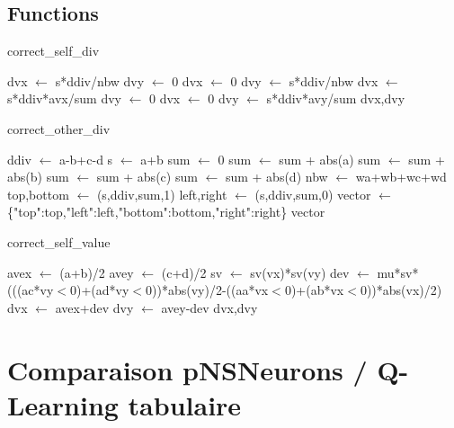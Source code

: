 \documentclass[10pt]{article}
\begin{document}
\newpage
\subsection{Functions}
\begin{algorithm}
\caption{correct\_self\_div}
\begin{algorithmic}
\STATE dvx $\leftarrow$ s*ddiv/nbw
\STATE dvy $\leftarrow$ 0
\ELSE
\STATE dvx $\leftarrow$ 0
\STATE dvy $\leftarrow$ s*ddiv/nbw
\ENDIF
\ELSE
{}
\STATE dvx $\leftarrow$ s*ddiv*avx/sum
\STATE dvy $\leftarrow$ 0
\ELSE
\STATE dvx $\leftarrow$ 0
\STATE dvy $\leftarrow$ s*ddiv*avy/sum
\ENDIF
\ENDIF
\RETURN dvx,dvy
\end{algorithmic}
\end{algorithm}

\begin{algorithm}
\caption{correct\_other\_div}
\begin{algorithmic}
\STATE ddiv $\leftarrow$ a-b+c-d
\STATE s $\leftarrow$ a+b
\STATE sum $\leftarrow$ 0
\STATE sum $\leftarrow$ sum + abs(a)
\ENDIF
{}
\STATE sum $\leftarrow$ sum + abs(b)
\ENDIF
{}
\STATE sum $\leftarrow$ sum + abs(c)
\ENDIF
{}
\STATE sum $\leftarrow$ sum + abs(d)
\ENDIF
\STATE nbw $\leftarrow$ wa+wb+wc+wd
\STATE top,bottom $\leftarrow$ (s,ddiv,sum,1)
\STATE left,right $\leftarrow$ (s,ddiv,sum,0)
\STATE vector $\leftarrow$ \{"top":top,"left":left,"bottom":bottom,"right":right\}
\RETURN vector
\end{algorithmic}
\end{algorithm}

\begin{algorithm}
\caption{correct\_self\_value}
\begin{algorithmic}
\STATE avex $\leftarrow$ (a+b)/2
\STATE avey $\leftarrow$ (c+d)/2
\STATE sv $\leftarrow$ sv(vx)*sv(vy)
\STATE dev $\leftarrow$ mu*sv*(((ac*vy$<$0)+(ad*vy$<$0))*abs(vy)/2-((aa*vx$<$0)+(ab*vx$<$0))*abs(vx)/2)
\STATE dvx $\leftarrow$ avex+dev
\STATE dvy $\leftarrow$ avey-dev
\RETURN dvx,dvy
\end{algorithmic}
\end{algorithm}
\newpage
\section{Comparaison pNSNeurons / Q-Learning tabulaire}
\end{document}
